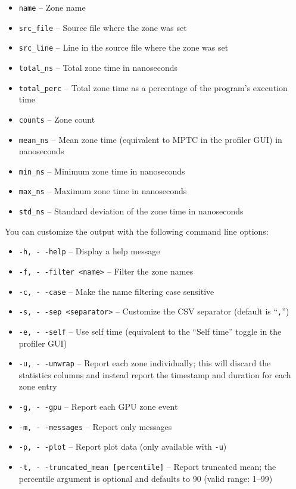 \documentclass[hidelinks,titlepage,a4paper,twoside]{article}
\begin{document}
\begin{itemize}
  \item \texttt{name} -- Zone name
  \item \texttt{src\_file} -- Source file where the zone was set
  \item \texttt{src\_line} -- Line in the source file where the zone was set
  \item \texttt{total\_ns} -- Total zone time in nanoseconds
  \item \texttt{total\_perc} -- Total zone time as a percentage of the program's execution time
  \item \texttt{counts} -- Zone count
  \item \texttt{mean\_ns} -- Mean zone time (equivalent to MPTC in the profiler GUI) in nanoseconds
  \item \texttt{min\_ns} -- Minimum zone time in nanoseconds
  \item \texttt{max\_ns} -- Maximum zone time in nanoseconds
  \item \texttt{std\_ns} -- Standard deviation of the zone time in nanoseconds
\end{itemize}

You can customize the output with the following command line options:

\begin{itemize}
  \item \texttt{-h, -\hspace{-1.25ex} -help} -- Display a help message
  \item \texttt{-f, -\hspace{-1.25ex} -filter <name>} -- Filter the zone names
  \item \texttt{-c, -\hspace{-1.25ex} -case} -- Make the name filtering case sensitive
  \item \texttt{-s, -\hspace{-1.25ex} -sep <separator>} -- Customize the CSV separator (default is ``\texttt{,}'')
  \item \texttt{-e, -\hspace{-1.25ex} -self} -- Use self time (equivalent to the ``Self time'' toggle in the profiler GUI)
  \item \texttt{-u, -\hspace{-1.25ex} -unwrap} -- Report each zone individually; this will discard the statistics columns and instead report the timestamp and duration for each zone entry
  \item \texttt{-g, -\hspace{-1.25ex} -gpu} -- Report each GPU zone event
  \item \texttt{-m, -\hspace{-1.25ex} -messages} -- Report only messages
  \item \texttt{-p, -\hspace{-1.25ex} -plot} -- Report plot data (only available with \texttt{-u})
  \item \texttt{-t, -\hspace{-1.25ex} -truncated\_mean [percentile]} -- Report truncated mean; the percentile argument is optional and defaults to 90 (valid range: 1--99)
\end{itemize}
\end{document}
